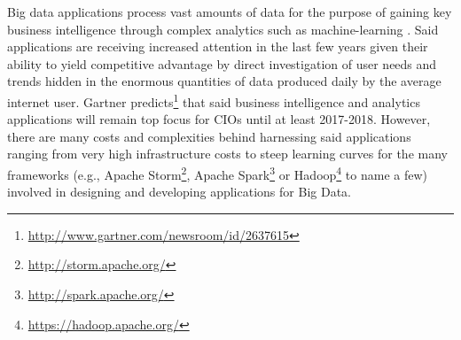 
Big data applications process vast amounts of data \cite{bdsurvey} for the purpose of gaining key business intelligence through complex analytics such as machine-learning \cite{ml4bd}. Said applications are receiving increased attention in the last few years given their ability to yield competitive advantage by direct investigation of user needs and trends hidden in the enormous quantities of data produced daily by the average internet user. Gartner predicts\footnote{\url{http://www.gartner.com/newsroom/id/2637615}} that said business intelligence and analytics applications will remain top focus for CIOs until at least 2017-2018. 
However, there are many costs and complexities behind harnessing said applications ranging from very high infrastructure costs to steep learning curves for the many frameworks (e.g., Apache Storm\footnote{\url{http://storm.apache.org/}}, Apache Spark\footnote{\url{http://spark.apache.org/}} or Hadoop\footnote{\url{https://hadoop.apache.org/}} to name a few) involved in designing and developing applications for Big Data.

